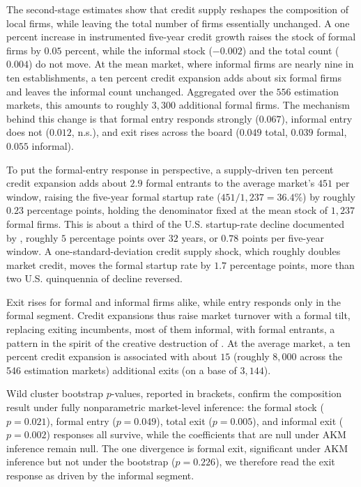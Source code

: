 \documentclass[12pt]{article}
\begin{document}
The second-stage estimates show that credit supply reshapes the composition of local firms, while leaving the total number of firms essentially unchanged. A one percent increase in instrumented five-year credit growth raises the stock of formal firms by $0.05$ percent, while the informal stock ($-0.002$) and the total count ($0.004$) do not move. At the mean market, where informal firms are nearly nine in ten establishments, a ten percent credit expansion adds about six formal firms and leaves the informal count unchanged. Aggregated over the $556$ estimation markets, this amounts to roughly $3{,}300$ additional formal firms. The mechanism behind this change is that formal entry responds strongly ($0.067$), informal entry does not ($0.012$, n.s.), and exit rises across the board ($0.049$ total, $0.039$ formal, $0.055$ informal).

To put the formal-entry response in perspective, a supply-driven ten percent credit expansion adds about $2.9$ formal entrants to the average market's $451$ per window, raising the five-year formal startup rate ($451/1{,}237 = 36.4\%$) by roughly $0.23$ percentage points, holding the denominator fixed at the mean stock of $1{,}237$ formal firms. This is about a third of the U.S. startup-rate decline documented by \citet{pugsley2019grown}, roughly $5$ percentage points over $32$ years, or $0.78$ points per five-year window. A one-standard-deviation credit supply shock, which roughly doubles market credit, moves the formal startup rate by $1.7$ percentage points, more than two U.S. quinquennia of decline reversed.

Exit rises for formal and informal firms alike, while entry responds only in the formal segment. Credit expansions thus raise market turnover with a formal tilt, replacing exiting incumbents, most of them informal, with formal entrants, a pattern in the spirit of the creative destruction of \citet{schumpeter1942creative}. At the average market, a ten percent credit expansion is associated with about $15$ (roughly $8{,}000$ across the 546 estimation markets) additional exits (on a base of $3{,}144$).

Wild cluster bootstrap $p$-values, reported in brackets, confirm the composition result under fully nonparametric market-level inference: the formal stock ($p=0.021$), formal entry ($p=0.049$), total exit ($p=0.005$), and informal exit ($p=0.002$) responses all survive, while the coefficients that are null under AKM inference remain null. The one divergence is formal exit, significant under AKM inference but not under the bootstrap ($p=0.226$), we therefore read the exit response as driven by the informal segment.
\end{document}
